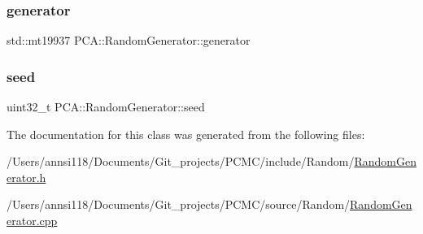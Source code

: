 \subsubsection{\texorpdfstring{generator}{generator}}
{\footnotesize\ttfamily std\+::mt19937 P\+C\+A\+::\+Random\+Generator\+::generator\hspace{0.3cm}{\ttfamily [static]}}

\hypertarget{class_p_c_a_1_1_random_generator_af96d99ba4eaf71b7d33afd2fbdb7c30d}{}\label{class_p_c_a_1_1_random_generator_af96d99ba4eaf71b7d33afd2fbdb7c30d} 
\subsubsection{\texorpdfstring{seed}{seed}}
{\footnotesize\ttfamily uint32\+\_\+t P\+C\+A\+::\+Random\+Generator\+::seed\hspace{0.3cm}{\ttfamily [static]}}



The documentation for this class was generated from the following files\+:\begin{DoxyCompactItemize}
\item 
/\+Users/annsi118/\+Documents/\+Git\+\_\+projects/\+P\+C\+M\+C/include/\+Random/\hyperlink{_random_generator_8h}{Random\+Generator.\+h}\item 
/\+Users/annsi118/\+Documents/\+Git\+\_\+projects/\+P\+C\+M\+C/source/\+Random/\hyperlink{_random_generator_8cpp}{Random\+Generator.\+cpp}\end{DoxyCompactItemize}
